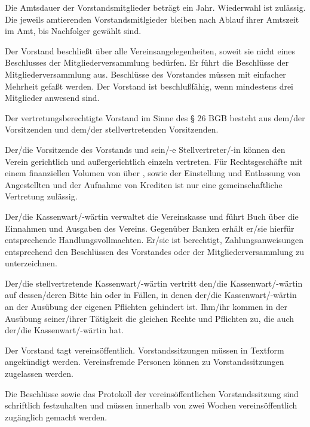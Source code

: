 \documentclass[draft]{scrartcl}
\begin{document}
\begin{contract}
Die Amtsdauer der Vorstandsmitglieder beträgt ein Jahr. Wiederwahl ist
zulässig. Die jeweils amtierenden Vorstandsmitlgieder bleiben nach Ablauf
ihrer Amtszeit im Amt, bis Nachfolger gewählt sind.

Der Vorstand beschließt über alle Vereinsangelegenheiten, soweit sie nicht
eines Beschlusses der Mitgliederversammlung bedürfen. Er führt die Beschlüsse
der Mitgliederversammlung aus. Beschlüsse des Vorstandes müssen mit
einfacher Mehrheit gefaßt werden. Der Vorstand ist beschlußfähig, wenn
mindestens drei Mitglieder anwesend sind.


Der vertretungsberechtigte Vorstand im Sinne des § 26 BGB besteht aus dem/der
Vorsitzenden und dem/der stellvertretenden Vorsitzenden.

Der/die Vorsitzende des Vorstands und sein/-e Stellvertreter/-in können den
Verein gerichtlich und außergerichtlich einzeln vertreten. Für Rechtsgeschäfte
mit einem finanziellen Volumen von über , sowie der Einstellung und
Entlassung von Angestellten und der Aufnahme von Krediten ist nur eine
gemeinschaftliche Vertretung zulässig.

Der/die Kassenwart/-wärtin verwaltet die Vereinskasse und führt Buch über die
Einnahmen und Ausgaben des Vereins. Gegenüber Banken erhält er/sie hierfür
entsprechende Handlungsvollmachten. Er/sie ist berechtigt, Zahlungsanweisungen
entsprechend den Beschlüssen des Vorstandes oder der Mitgliederversammlung zu
unterzeichnen.

Der/die stellvertretende Kassenwart/-wärtin vertritt den/die Kassenwart/-wärtin
auf dessen/deren Bitte hin oder in Fällen, in denen der/die Kassenwart/-wärtin
an der Ausübung der eigenen Pflichten gehindert ist. Ihm/ihr kommen in der
Ausübung seiner/ihrer Tätigkeit die gleichen Rechte und Pflichten zu, die auch
der/die Kassenwart/-wärtin hat.


Der Vorstand tagt vereinsöffentlich. Vorstandssitzungen müssen in Textform
angekündigt werden. Vereinsfremde Personen können zu Vorstandssitzungen
zugelassen werden.

Die Beschlüsse sowie das Protokoll der vereinsöffentlichen Vorstandssitzung
sind schriftlich festzuhalten und müssen innerhalb von zwei Wochen
vereinsöffentlich zu\-gäng\-lich gemacht werden.



\end{contract}
\end{document}
